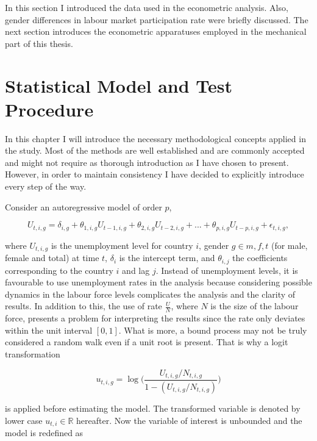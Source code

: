 \documentclass[12pt,a4paper,english]{article}
\begin{document}
In this section I introduced the data used in the econometric analysis. Also, gender differences in labour market participation rate were briefly discussed. The next section introduces the econometric apparatuses employed in the mechanical part of this thesis.

\clearpage
\section{Statistical Model and Test Procedure}

In this chapter I will introduce the necessary methodological concepts applied in the study. Most of the methods are well established and are commonly accepted and might not require as thorough introduction as I have chosen to present. However, in order to maintain consistency I have decided to explicitly introduce every step of the way.

Consider an autoregressive model of order $p$, 

\begin{equation}
U_{t,i,g} = \delta_{i,g} + \theta_{1,i,g} U_{t-1,i,g} + \theta_{2,i,g} U_{t-2,i,g} + ... + \theta_{p,i,g}U_{t-p,i,g} + \epsilon_{t,i,g} ,
\end{equation}

where $U_{t,i,g}$ is the unemployment level for country $i$, gender $g \in {m,f,t}$ (for male, female and total) at time $t$, $\delta_i$ is the intercept term, and $\theta_{i,j}$ the coefficients corresponding to the country $i$ and lag $j$. Instead of unemployment levels, it is favourable to use unemployment rates in the analysis because considering possible dynamics in the labour force levels complicates the analysis and the clarity of results. In addition to this, the use of rate $\frac{U}{N}$, where $N$ is the size of the labour force, presents a problem for interpreting the results since the rate only deviates within the unit interval $[0,1]$. What is more, a bound process may not be truly considered a random walk even if a unit root is present. That is why a logit transformation

\begin{equation}
u_{t,i,g} = \log\bigg(\dfrac{U_{t,i,g}/N_{t,i,g}}{1-(U_{t,i,g}/N_{t,i,g})}\bigg)
\end{equation}

is applied before estimating the model. The transformed variable is denoted by lower case $u_{t,i} \in \mathbb{R}$ hereafter. Now the variable of interest is unbounded and the model is redefined as
\end{document}
